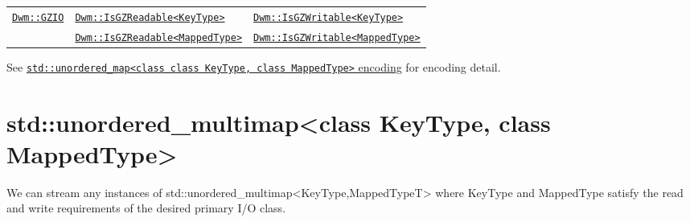 \begin{minipage}{\textwidth}
\begin{tabular}{lll}
\multirow{2}{*}{\hyperref[section:DwmGZIOClass]{\texttt{Dwm::GZIO}}} & \hyperref[concept:DwmIsGZReadable]{\texttt{Dwm::IsGZReadable<KeyType>}} & \hyperref[concept:DwmIsGZWritable]{\texttt{Dwm::IsGZWritable<KeyType>}} \\
 & \hyperref[concept:DwmIsGZReadable]{\texttt{Dwm::IsGZReadable<MappedType>}} & \hyperref[concept:DwmIsGZWritable]{\texttt{Dwm::IsGZWritable<MappedType>}} \\
\end{tabular}
\vspace{1ex}

See \hyperref[encoding:stdUnorderedMap]{\texttt{std::unordered\_map<class class KeyType, class MappedType>} encoding} for encoding detail.
\end{minipage}

\begin{minipage}{\textwidth}
\section{\ttfamily std::unordered\_multimap<class KeyType, class MappedType>}
We can stream any instances of
{\ttfamily std::unordered\_multimap<KeyType,MappedTypeT>} where
{\ttfamily KeyType} and {\ttfamily MappedType} satisfy the read
and write requirements of the desired primary I/O class.
\vspace{1ex}


\end{minipage}
